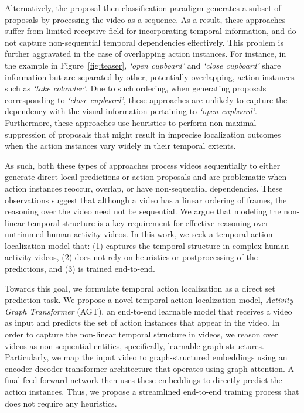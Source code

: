 \documentclass[10pt,twocolumn,letterpaper]{article}
\begin{document}
Alternatively, the proposal-then-classification paradigm generates a subset of proposals by processing the video as a sequence. As a result, these approaches suffer from limited receptive field for incorporating temporal information, and do not capture non-sequential temporal dependencies effectively. This problem is further aggravated in the case of overlapping action instances.
For instance, in the example in Figure~\ref{fig:teaser}, \textit{`open cupboard'} and \textit{`close cupboard'} share information but are separated by other, potentially overlapping, action instances such as \textit{`take colander'}. Due to such ordering, when generating proposals corresponding to \textit{`close cupboard'}, these approaches are unlikely to capture the dependency with the visual information pertaining to \textit{`open cupboard'}.
Furthermore, these approaches use heuristics to perform non-maximal suppression of proposals  that might result in imprecise localization outcomes when the action instances vary widely in their temporal extents. 








As such, both these types of approaches process videos sequentially to either generate direct local predictions or action proposals and are problematic when action instances reoccur, overlap, or have non-sequential dependencies.
These observations suggest that although a video has a linear ordering of frames, the reasoning over the video need not be sequential. We argue that modeling the non-linear temporal structure is a key requirement for effective reasoning over untrimmed human activity videos. In this work, we seek a temporal action localization model that: (1) captures the temporal structure in complex human activity videos, (2) does not rely on heuristics or postprocessing of the predictions, and (3) is trained end-to-end.

Towards this goal, we formulate temporal action localization as a direct set prediction task. 
We propose a novel temporal action localization model, \textit{Activity Graph Transformer} (AGT), an end-to-end learnable model that receives a video as input and predicts the set of action instances that appear in the video. In order to capture the non-linear temporal structure in videos, we reason over videos as non-sequential entities, specifically, learnable graph structures. Particularly, we map the input video to graph-structured embeddings using an encoder-decoder transformer architecture that operates using graph attention. A final feed forward network then uses these embeddings to directly predict the action instances.
Thus, we propose a streamlined end-to-end training process that does not require any heuristics.
\end{document}
